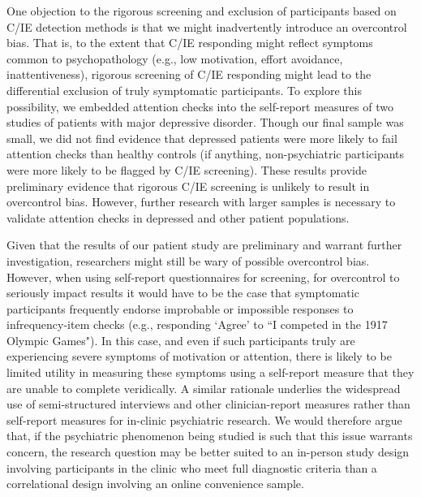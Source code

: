 \documentclass[a4paper,notitlepage,12pt]{article}
\begin{document}
One objection to the rigorous screening and exclusion of participants based on C/IE detection methods is that we might inadvertently introduce an overcontrol bias. That is, to the extent that C/IE responding might reflect symptoms common to psychopathology (e.g., low motivation, effort avoidance, inattentiveness), rigorous screening of C/IE responding might lead to the differential exclusion of truly symptomatic participants. To explore this possibility, we embedded attention checks into the self-report measures of two studies of patients with major depressive disorder. Though our final sample was small, we did not find evidence that depressed patients were more likely to fail attention checks than healthy controls (if anything, non-psychiatric participants were more likely to be flagged by C/IE screening). These results provide preliminary evidence that rigorous C/IE screening is unlikely to result in overcontrol bias. However, further research with larger samples is necessary to validate attention checks in depressed and other patient populations. 

Given that the results of our patient study are preliminary and warrant further investigation, researchers might still be wary of possible overcontrol bias. However, when using self-report questionnaires for screening, for overcontrol to seriously impact results it would have to be the case that symptomatic participants frequently endorse improbable or impossible responses to infrequency-item checks (e.g., responding `Agree' to ``I competed in the 1917 Olympic Games"). In this case, and even if such participants truly are experiencing severe symptoms of motivation or attention, there is likely to be limited utility in measuring these symptoms using a self-report measure that they are unable to complete veridically. A similar rationale underlies the widespread use of semi-structured interviews and other clinician-report measures rather than self-report measures for in-clinic psychiatric research. We would therefore argue that, if the psychiatric phenomenon being studied is such that this issue warrants concern, the research question may be better suited to an in-person study design involving participants in the clinic who meet full diagnostic criteria than a correlational design involving an online convenience sample.
\end{document}
